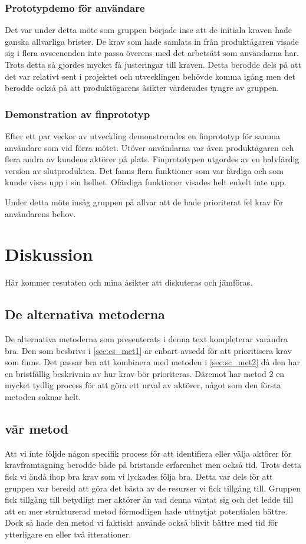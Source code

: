 \subsubsection{Prototypdemo för användare}
Det var under detta möte som gruppen började inse att de initiala kraven hade ganska allvarliga brister. De krav som hade samlats in från produktägaren visade sig i flera avseenenden inte passa överens med det arbetsätt som användarna har. Trots detta så gjordes mycket få justeringar till kraven. Detta berodde dels på att det var relativt sent i projektet och utvecklingen behövde komma igång men det berodde också på att produktägarens åsikter värderades tyngre av gruppen.

\subsubsection{Demonstration av finprototyp}
Efter ett par veckor av utveckling demonstrerades en finprototyp för samma användare som vid förra mötet. Utöver användarna var även produktägaren och flera andra av kundens aktörer på plats. Finprototypen utgordes av en halvfärdig version av slutprodukten. Det fanns flera funktioner som var färdiga och som kunde visas upp i sin helhet. Ofärdiga funktioner visades helt enkelt inte upp.

Under detta möte insåg gruppen på allvar att de hade prioriterat fel krav för användarens behov.


\section{Diskussion}
Här kommer resutaten och mina åsikter att diskuteras och jämföras.

\subsection{De alternativa metoderna}
De alternativa metoderna som presenterats i denna text kompleterar varandra bra. Den som besbrivs i \ref{sec:cs_met1} är enbart avsedd för att prioritisera krav som finns. Det passar bra att kombinera med metoden i \ref{sec:sc_met2} då den har en bristfällig beskrivnin av hur krav bör prioriteras. Däremot har metod 2 en mycket tydlig process för att göra ett urval av aktörer, något som den första metoden saknar helt. 

\subsection{vår metod}
Att vi inte följde någon specifik process för att identifiera eller välja aktörer för kravframtagning berodde både på bristande erfarenhet men också tid. Trots detta fick vi ändå ihop bra krav som vi lyckades följa bra. Detta var dels för att gruppen var beredd att göra det bästa av de resurser vi fick tillgång till. Gruppen fick tillgång till betydligt mer aktörer än vad denna väntat sig och det ledde till att en mer strukturerad metod förmodligen hade uttnytjat potentialen bättre. Dock så hade den metod vi faktiskt använde också blivit bättre med tid för ytterligare en eller två itterationer.

